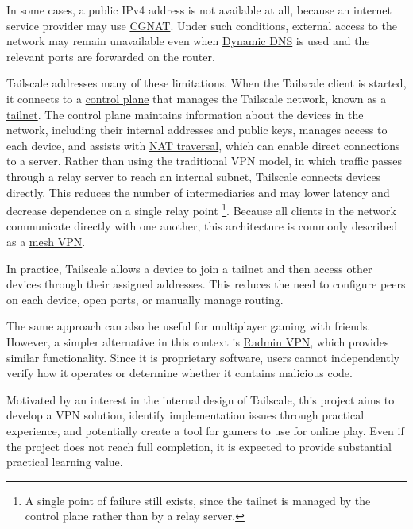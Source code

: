 \documentclass[a4paper, 10pt]{article}
\begin{document}
In some cases, a public IPv4 address is not available at all, because an internet service provider may use
\href{https://en.wikipedia.org/wiki/Carrier-grade_NAT}{CGNAT}. Under such conditions, external access to the network may remain unavailable
even when \href{https://en.wikipedia.org/wiki/Dynamic_DNS}{Dynamic DNS} is used and the relevant ports are forwarded on the router.

Tailscale addresses many of these limitations. When the Tailscale client is started, it connects to a
\href{https://tailscale.com/docs/concepts/control-data-planes}{control plane} that manages the Tailscale network, known as a
\href{https://tailscale.com/docs/concepts/tailnet}{tailnet}. The control plane maintains information about the devices in the network,
including their internal addresses and public keys, manages access to each device, and assists with \href{https://tailscale.com/blog/how-nat-traversal-works}{NAT traversal},
which can enable direct connections to a server. Rather than using the traditional VPN model,
in which traffic passes through a relay server to reach an internal subnet, Tailscale connects devices directly.
This reduces the number of intermediaries and may lower latency and decrease dependence on a single relay point
\footnote{A single point of failure still exists, since the tailnet is managed by the control plane rather than by a relay server.}.
Because all clients in the network communicate directly with one another, this architecture is commonly described as a \href{https://en.wikipedia.org/wiki/Mesh_networking}{mesh VPN}.

In practice, Tailscale allows a device to join a tailnet and then access other devices through their assigned addresses.
This reduces the need to configure peers on each device, open ports, or manually manage routing.

The same approach can also be useful for multiplayer gaming with friends.
However, a simpler alternative in this context is \href{https://www.radmin-vpn.com/}{Radmin VPN}, which provides similar functionality.
Since it is proprietary software, users cannot independently verify how it operates or determine whether it contains malicious code.

Motivated by an interest in the internal design of Tailscale, this project aims to develop a VPN solution, identify implementation issues through practical experience,
and potentially create a tool for gamers to use for online play. Even if the project does not reach full completion, it is expected to provide substantial practical learning value.
\end{document}
